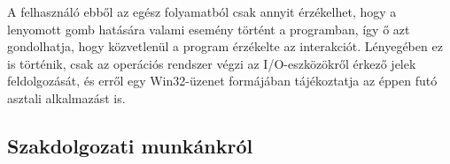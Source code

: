 \documentclass[tocnopagenum]{thesis-ekf}
\begin{document}
	A felhasználó ebből az egész folyamatból csak annyit érzékelhet, hogy a lenyomott gomb hatására valami esemény történt a programban, így ő azt gondolhatja, hogy közvetlenül a program érzékelte az interakciót. Lényegében ez is történik, csak az operációs rendszer végzi az I/O-eszközökről érkező jelek feldolgozását, és erről egy Win32-üzenet formájában tájékoztatja az éppen futó asztali alkalmazást is.

	\subsection{Szakdolgozati munkánkról}

\end{document}
